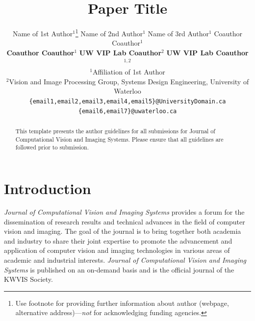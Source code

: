 \documentclass[letterpaper]{CVIS}
\title{Paper Title}
\begin{document}
\sloppy
\author{
Name of 1st Author$^{1}$\thanks{Use footnote for providing further information
    about author (webpage, alternative address)---\emph{not} for acknowledging
    funding agencies.} \quad Name of 2nd Author$^{1}$ \quad Name of 3rd Author$^{1}$ \quad Coauthor Coauthor$^{1}$ \\ \quad \textbf{Coauthor Coauthor}$^{1}$ \quad \textbf{UW VIP Lab Coauthor}$^{2}$  \quad \textbf{UW VIP Lab Coauthor}$^{1,2}$\\
$^1$Affiliation of 1st Author\\
$^2$Vision and Image Processing Group, Systems Design Engineering, University of Waterloo\\
\texttt{\{email1,email2,email3,email4,email5\}@UniversityDomain.ca}\\
\texttt{\{email6,email7\}@uwaterloo.ca}
}

\maketitle
\begin{abstract} %
	This template presents the author guidelines for all submissions for Journal of Computational Vision and Imaging Systems. Please ensure that all guidelines are followed prior to submission.
\end{abstract}

\section{Introduction}


\textit{Journal of Computational Vision and Imaging Systems} provides a forum for the dissemination of research results and technical advances in the field of computer vision and imaging.  The goal of the journal is to bring together both academia and industry to share their joint expertise to promote the advancement and application of computer vision and imaging technologies in various areas of academic and industrial interests.   \textit{Journal of Computational Vision and Imaging Systems} is published on an on-demand basis and is the official journal of the KWVIS Society.\\
\end{document}
